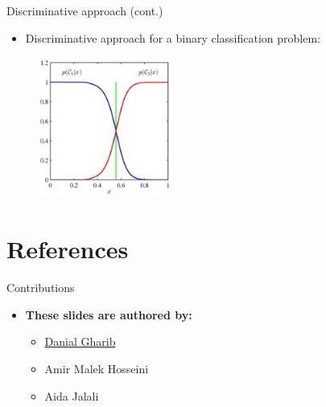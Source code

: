 \documentclass[serif, aspectratio=169]{beamer}
\begin{document}
\begin{frame}{Discriminative approach (cont.)}
    \begin{itemize}
        \item Discriminative approach for a binary classification problem:
    \end{itemize}
    \begin{figure}[h]
      \centering
      \includegraphics[width=0.4\textwidth]{pic/Disc.png}
      \end{figure}
    \vfill
\end{frame}




\section{References}

\begin{frame}{Contributions}
\begin{itemize}
\item \textbf{These slides are authored by:}
\begin{itemize}
    \setlength{\itemsep}{5pt} %
    \item \href{https://github.com/Danial-Gharib}{Danial Gharib}
    \item {Amir Malek Hosseini}
    \item {Aida Jalali}
\end{itemize}
\end{itemize}

\end{frame}

\begin{frame}[allowframebreaks]
    
    
    \nocite{*}
\end{frame}
\end{document}
